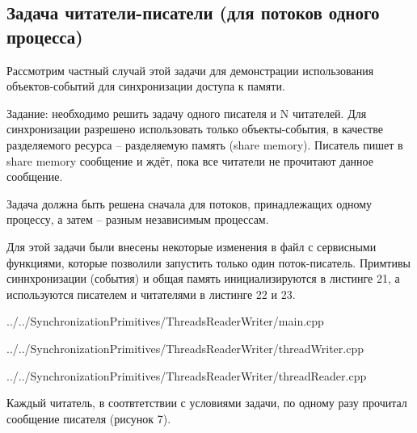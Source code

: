 \documentclass[a4paper, 12pt]{article}		%
\begin{document}
\newpage
\subsection{Задача читатели-писатели (для потоков одного процесса)}

Рассмотрим частный случай этой задачи для демонстрации использования объектов-событий для синхронизации доступа к памяти.

Задание: необходимо решить задачу одного писателя и N читателей. Для синхронизации разрешено использовать только объекты-события, в качестве разделяемого ресурса -- разделяемую память (share memory). Писатель пишет в share memory сообщение и ждёт, пока все читатели не прочитают данное сообщение.

Задача должна быть решена сначала для потоков, принадлежащих одному процессу, а затем – разным независимым процессам.

Для этой задачи были внесены некоторые изменения в файл с сервисными функциями, которые позволили запустить только один поток-писатель. Примтивы синнхронизации (события) и общая память инициализируются в листинге 21, а используются писателем и читателями в листинге 22 и 23.


{../../SynchronizationPrimitives/ThreadsReaderWriter/main.cpp}


{../../SynchronizationPrimitives/ThreadsReaderWriter/threadWriter.cpp}


{../../SynchronizationPrimitives/ThreadsReaderWriter/threadReader.cpp}
\newpage

Каждый читатель, в соотвтетствии с условиями задачи, по одному разу прочитал сообщение писателя (рисунок 7).
\end{document}
